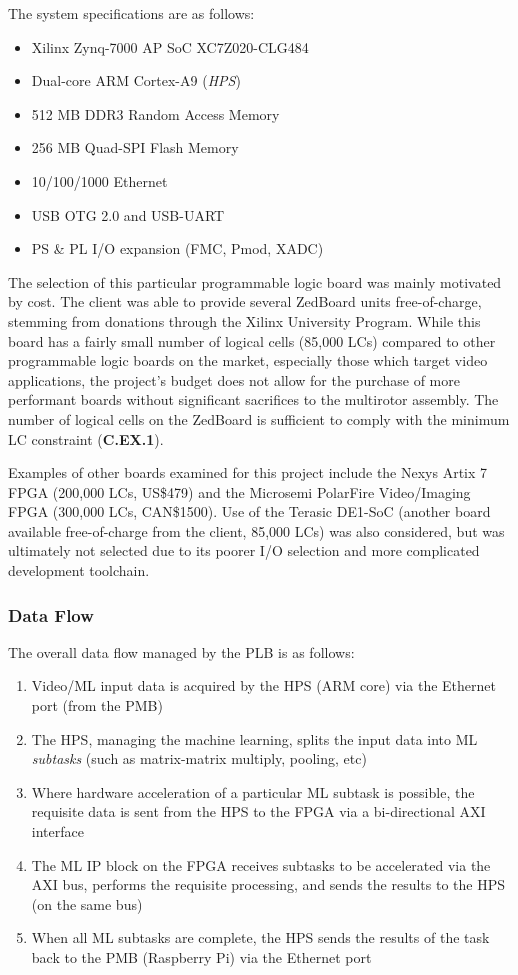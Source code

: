 The system specifications are as follows\cite{zedboard}:
\begin{itemize}
\item Xilinx Zynq-7000 AP SoC XC7Z020-CLG484
\item Dual-core ARM Cortex-A9 (\textit{HPS})
\item 512 MB DDR3 Random Access Memory
\item 256 MB Quad-SPI Flash Memory
\item 10/100/1000 Ethernet 
\item USB OTG 2.0 and USB-UART 
\item PS \& PL I/O expansion (FMC, Pmod, XADC)
\end{itemize}

The selection of this particular programmable logic board was mainly motivated by cost. The client was able to provide several ZedBoard units free-of-charge, stemming from donations through the Xilinx University Program. While this board has a fairly small number of logical cells (85,000 LCs) compared to other programmable logic boards on the market, especially those which target video applications, the project's budget does not allow for the purchase of more performant boards without significant sacrifices to the multirotor assembly. The number of logical cells on the ZedBoard is sufficient to comply with the minimum LC constraint (\textbf{C.EX.1}).

Examples of other boards examined for this project include the Nexys Artix 7 FPGA (200,000 LCs, US\$479)\cite{nexys} and the Microsemi PolarFire Video/Imaging FPGA (300,000 LCs, CAN\$1500)\cite{microsemi}. Use of the Terasic DE1-SoC (another board available free-of-charge from the client, 85,000 LCs) was also considered, but was ultimately not selected due to its poorer I/O selection and more complicated development toolchain.

\subsubsection{Data Flow}
The overall data flow managed by the PLB is as follows:
\begin{enumerate}
\item Video/ML input data is acquired by the HPS (ARM core) via the Ethernet port (from the PMB)
\item The HPS, managing the machine learning, splits the input data into ML \textit{subtasks} (such as matrix-matrix multiply, pooling, etc)
\item Where hardware acceleration of a particular ML subtask is possible, the requisite data is sent from the HPS to the FPGA via a bi-directional AXI interface
\item The ML IP block on the FPGA receives subtasks to be accelerated via the AXI bus, performs the requisite processing, and sends the results to the HPS (on the same bus)
\item When all ML subtasks are complete, the HPS sends the results of the task back to the PMB (Raspberry Pi) via the Ethernet port
\end{enumerate}

